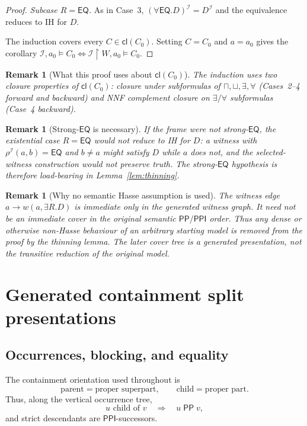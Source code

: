 \documentclass[11pt]{article}
\newtheorem{remark}[theorem]{Remark}
\newcommand{\EQ}{\mathsf{EQ}}
\newcommand{\PP}{\mathsf{PP}}
\newcommand{\PPI}{\mathsf{PPI}}
\newcommand{\Cl}{\mathsf{cl}}
\newcommand{\I}{\mathcal I}
\begin{document}
\begin{proof}
\emph{Subcase $R=\EQ$.}  As in Case~3,
$(\forall \EQ.D)^\I=D^\I$ and the equivalence reduces to IH for $D$.

The induction covers every $C\in\Cl(C_0)$.  Setting $C=C_0$ and
$a=a_0$ gives the corollary
$\I,a_0\models C_0\iff\I\!\upharpoonright\!W,a_0\models C_0$.
\end{proof}

\begin{remark}[What this proof uses about $\Cl(C_0)$]
The induction uses two closure properties of $\Cl(C_0)$: closure
under subformulas of $\sqcap,\sqcup,\exists,\forall$ (Cases~2--4
forward and backward) and \emph{NNF complement closure} on
$\exists/\forall$ subformulas (Case~4 backward).
\end{remark}

\begin{remark}[Strong-$\EQ$ is necessary]
If the frame were not strong-$\EQ$, the existential case $R=\EQ$
would not reduce to IH for $D$: a witness with $\rho^\I(a,b)=\EQ$ and
$b\ne a$ might satisfy $D$ while $a$ does not, and the selected-witness
construction would not preserve truth.  The strong-$\EQ$ hypothesis
is therefore load-bearing in Lemma~\ref{lem:thinning}.
\end{remark}

\begin{remark}[Why no semantic Hasse assumption is used]
The witness edge $a\to w(a,\exists R.D)$ is immediate only in the generated witness graph.  It need not be an immediate cover in the original semantic $\PP/\PPI$ order.  Thus any dense or otherwise non-Hasse behaviour of an arbitrary starting model is removed from the proof by the thinning lemma.  The later cover tree is a generated presentation, not the transitive reduction of the original model.
\end{remark}

\section{Generated containment split presentations}

\subsection{Occurrences, blocking, and equality}

The containment orientation used throughout is
\[
  \text{parent} = \text{proper superpart},
  \qquad
  \text{child} = \text{proper part}.
\]
Thus, along the vertical occurrence tree,
\[
  u \text{ child of } v \quad\Rightarrow\quad u\;\PP\;v,
\]
and strict descendants are $\PPI$-successors.
\end{document}
